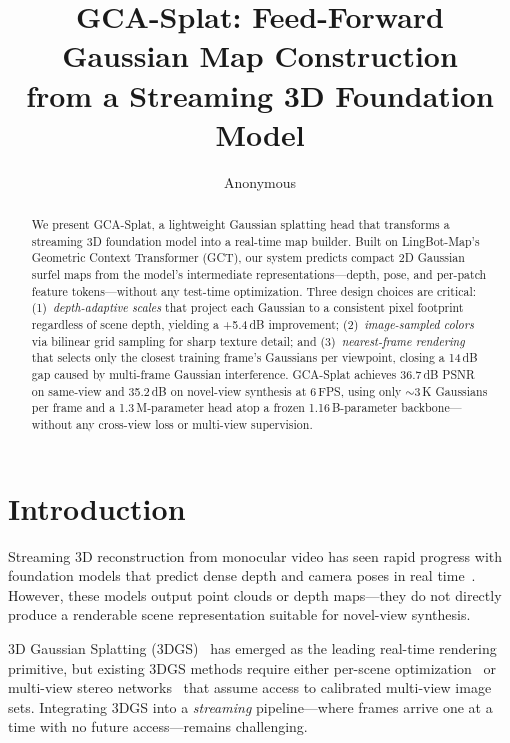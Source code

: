 \documentclass[10pt,twocolumn]{article}
\title{GCA-Splat: Feed-Forward Gaussian Map Construction\\from a Streaming 3D Foundation Model}
\author{Anonymous}
\date{}
\begin{document}
\maketitle

\begin{abstract}
We present GCA-Splat, a lightweight Gaussian splatting head that transforms a streaming 3D foundation model into a real-time map builder.
Built on LingBot-Map's Geometric Context Transformer (GCT), our system predicts compact 2D Gaussian surfel maps from the model's intermediate representations---depth, pose, and per-patch feature tokens---without any test-time optimization.
Three design choices are critical:
(1)~\emph{depth-adaptive scales} that project each Gaussian to a consistent pixel footprint regardless of scene depth, yielding a +5.4\,dB improvement;
(2)~\emph{image-sampled colors} via bilinear grid sampling for sharp texture detail;
and (3)~\emph{nearest-frame rendering} that selects only the closest training frame's Gaussians per viewpoint, closing a 14\,dB gap caused by multi-frame Gaussian interference.
GCA-Splat achieves 36.7\,dB PSNR on same-view and 35.2\,dB on novel-view synthesis at 6\,FPS, using only ${\sim}$3\,K Gaussians per frame and a 1.3\,M-parameter head atop a frozen 1.16\,B-parameter backbone---without any cross-view loss or multi-view supervision.
\end{abstract}

\section{Introduction}
\label{sec:intro}

Streaming 3D reconstruction from monocular video has seen rapid progress with foundation models that predict dense depth and camera poses in real time~\cite{lingbotmap}.
However, these models output point clouds or depth maps---they do not directly produce a renderable scene representation suitable for novel-view synthesis.

3D Gaussian Splatting (3DGS)~\cite{kerbl3dgs} has emerged as the leading real-time rendering primitive, but existing 3DGS methods require either per-scene optimization~\cite{kerbl3dgs} or multi-view stereo networks~\cite{pixelsplat,mvsplat} that assume access to calibrated multi-view image sets.
Integrating 3DGS into a \emph{streaming} pipeline---where frames arrive one at a time with no future access---remains challenging.
\end{document}
